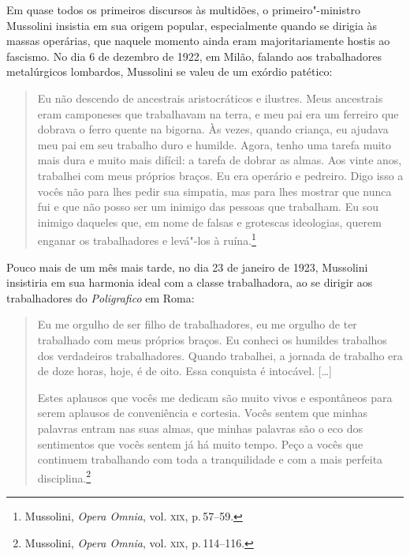 Em quase todos os primeiros discursos às multidões, o primeiro"-ministro
Mussolini insistia em sua origem popular, especialmente quando se
dirigia às massas operárias, que naquele momento ainda eram
majoritariamente hostis ao fascismo. No dia 6 de dezembro de 1922, em
Milão, falando aos trabalhadores metalúrgicos lombardos, Mussolini se
valeu de um exórdio patético:

\begin{quote}
Eu não descendo de ancestrais aristocráticos e ilustres. Meus ancestrais
eram camponeses que trabalhavam na terra, e meu pai era um ferreiro que
dobrava o ferro quente na bigorna. Às vezes, quando criança, eu ajudava
meu pai em seu trabalho duro e humilde. Agora, tenho uma tarefa muito
mais dura e muito mais difícil: a tarefa de dobrar as almas. Aos vinte
anos, trabalhei com meus próprios braços. Eu era operário e pedreiro.
Digo isso a vocês não para lhes pedir sua simpatia, mas para lhes
mostrar que nunca fui e que não posso ser um inimigo das pessoas que
trabalham. Eu sou inimigo daqueles que, em nome de falsas e grotescas
ideologias, querem enganar os trabalhadores e levá"-los à
ruína.\footnote{Mussolini, \emph{Opera Omnia}, vol. \textsc{xix}, p.\,57--59.}
\end{quote}

Pouco mais de um mês mais tarde, no dia 23 de janeiro de 1923, Mussolini
insistiria em sua harmonia ideal com a classe trabalhadora, ao se
dirigir aos trabalhadores do \emph{Poligrafico} em Roma:

\begin{quote}
Eu me orgulho de ser filho de trabalhadores, eu me orgulho de ter
trabalhado com meus próprios braços. Eu conheci os humildes trabalhos
dos verdadeiros trabalhadores. Quando trabalhei, a jornada de trabalho
era de doze horas, hoje, é de oito. Essa conquista é intocável.
{[}\ldots{}{]}

Estes aplausos que vocês me dedicam são muito vivos e espontâneos para
serem aplausos de conveniência e cortesia. Vocês sentem que minhas
palavras entram nas suas almas, que minhas palavras são o eco dos
sentimentos que vocês sentem já há muito tempo. Peço a vocês que
continuem trabalhando com toda a tranquilidade e com a mais perfeita
disciplina.\footnote{Mussolini, \emph{Opera Omnia}, vol. \textsc{xix}, p.\,114--116.}
\end{quote}

